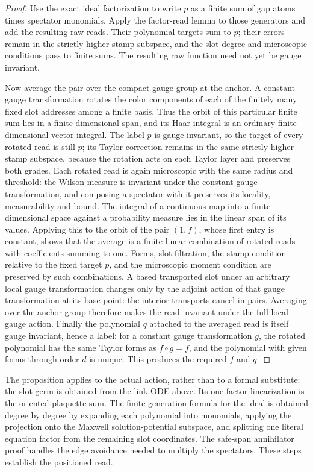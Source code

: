 \begin{proof}
Use the exact ideal factorization to write $p$ as a finite sum of gap
atoms times spectator monomials. Apply the factor-read lemma to those
generators and add the resulting raw reads. Their polynomial targets sum
to $p$; their errors remain in the strictly higher-stamp subspace, and
the slot-degree and microscopic conditions pass to finite sums. The
resulting raw function need not yet be gauge invariant.

Now average the pair over the compact gauge group at the anchor. A
constant gauge transformation rotates the color components of each of
the finitely many fixed slot addresses among a finite basis. Thus the
orbit of this particular finite sum lies in a finite-dimensional span,
and its Haar integral is an ordinary finite-dimensional vector integral.
The label $p$ is gauge invariant, so the target of every rotated read is
still $p$; its Taylor correction remains in the same strictly higher
stamp subspace, because the rotation acts on each Taylor layer and
preserves both grades. Each rotated read is again microscopic with the
same radius and threshold: the Wilson measure is invariant under the
constant gauge transformation, and composing a spectator with it
preserves its locality, measurability and bound. The integral of a
continuous map into a finite-dimensional space against a probability
measure lies in the linear span of its values. Applying this to the
orbit of the pair $(1,f)$, whose first entry is constant, shows that the
average is a finite linear combination of rotated reads with coefficients
summing to one. Forms, slot filtration, the stamp condition relative to
the fixed target $p$, and the microscopic moment
condition are preserved by such combinations. A based transported
slot under an arbitrary local gauge transformation changes only by the
adjoint action of that gauge transformation at its base point: the
interior transports cancel in pairs. Averaging over the anchor group
therefore makes the read invariant under the full local gauge action.
Finally the polynomial $q$ attached to the averaged read is itself gauge
invariant, hence a label: for a constant gauge transformation $g$, the
rotated polynomial has the same Taylor forms as $f\circ g=f$, and the
polynomial with given forms through order $d$ is unique.
This produces the required $f$ and $q$.
\end{proof}

The proposition applies to the actual action, rather than to a formal substitute:
the slot germ is obtained from the link ODE above. Its one-factor
linearization is the oriented plaquette sum. The finite-generation formula
for the ideal is obtained degree by degree by expanding each polynomial
into monomials, applying the projection onto the Maxwell
solution-potential subspace, and splitting one
literal equation factor from the remaining slot coordinates. The
safe-span annihilator proof handles the edge avoidance needed to multiply
the spectators. These steps establish the positioned read.

